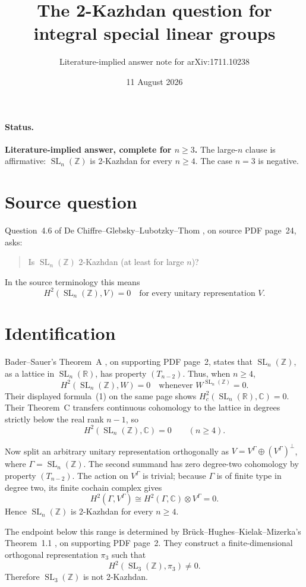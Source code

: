 \documentclass[11pt]{article}
\title{The 2-Kazhdan question for integral special linear groups}
\author{Literature-implied answer note for arXiv:1711.10238}
\date{11 August 2026}
\newcommand{\SL}{\operatorname{SL}}
\newcommand{\Z}{\mathbb Z}
\newcommand{\C}{\mathbb C}
\begin{document}
\maketitle

\paragraph{Status.}
\textbf{Literature-implied answer, complete for \(n\ge3\).}
The large-\(n\) clause is affirmative: \(\SL_n(\Z)\) is 2-Kazhdan for every
\(n\ge4\). The case \(n=3\) is negative.

\section*{Source question}
Question~4.6 of De Chiffre--Glebsky--Lubotzky--Thom
\cite{source}, on source PDF page~24, asks:
\begin{quote}
Is \(\SL_n(\Z)\) 2-Kazhdan (at least for large \(n\))?
\end{quote}
In the source terminology this means
\[
 H^2(\SL_n(\Z),V)=0
 \quad\text{for every unitary representation }V.
\]

\section*{Identification}
Bader--Sauer's Theorem~A \cite{bs}, on supporting PDF page~2, states that
\(\SL_n(\Z)\), as a lattice in \(\SL_n(\mathbb R)\), has property
\((T_{n-2})\). Thus, when \(n\ge4\),
\[
 H^2(\SL_n(\Z),W)=0
 \quad\text{whenever }W^{\SL_n(\Z)}=0.
\]
Their displayed formula~(1) on the same page shows
\(H_c^2(\SL_n(\mathbb R),\C)=0\). Their Theorem~C transfers continuous
cohomology to the lattice in degrees strictly below the real rank \(n-1\),
so
\[
 H^2(\SL_n(\Z),\C)=0 \qquad(n\ge4).
\]

Now split an arbitrary unitary representation orthogonally as
\(V=V^\Gamma\oplus(V^\Gamma)^\perp\), where \(\Gamma=\SL_n(\Z)\).
The second summand has zero degree-two cohomology by property
\((T_{n-2})\). The action on \(V^\Gamma\) is trivial; because \(\Gamma\) is
of finite type in degree two, its finite cochain complex gives
\[
 H^2(\Gamma,V^\Gamma)
 \cong H^2(\Gamma,\C)\otimes V^\Gamma=0.
\]
Hence \(\SL_n(\Z)\) is 2-Kazhdan for every \(n\ge4\).

The endpoint below this range is determined by
Br\"uck--Hughes--Kielak--Mizerka's Theorem~1.1 \cite{bhkm}, on supporting
PDF page~2. They construct a finite-dimensional orthogonal representation
\(\pi_3\) such that
\[
 H^2(\SL_3(\Z),\pi_3)\ne0.
\]
Therefore \(\SL_3(\Z)\) is not 2-Kazhdan.
\end{document}
